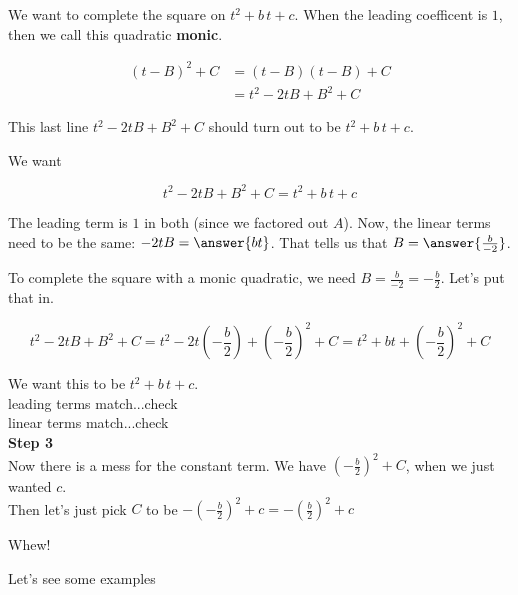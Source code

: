 \documentclass{ximera}
\begin{document}
We want to complete the square on $t^2 + b \, t + c$.  When the leading coefficent is $1$, then we call this quadratic \textbf{monic}.



\begin{align*}
(t-B)^2 + C & = (t-B)(t-B) + C \\
& = t^2 - 2 t B + B^2 + C  
\end{align*}


This last line $t^2 - 2 t B + B^2 + C$ should turn out to be $t^2 + b \, t + c$.

We want


\[   t^2 - 2 t B + B^2 + C = t^2 + b \, t + c   \]



\begin{explanation}


The leading term is $1$ in both (since we factored out $A$). Now, the linear terms need to be the same: $ - 2 t B = \answer{b t}$.  That tells us that $B = \answer{\frac{b}{-2}}$.

\end{explanation}


To complete the square with a monic quadratic, we need $B = \frac{b}{-2} = -\frac{b}{2}$.  Let's put that in.


\[ t^2 - 2 t B + B^2 + C = t^2 - 2 t \left( -\frac{b}{2} \right) + \left( -\frac{b}{2} \right)^2 + C = t^2 + b t + \left(-\frac{b}{2}\right)^2 + C \]


We want this to be $t^2 + b \, t + c$. \\

leading terms match...check \\
linear terms match...check \\


\textbf{\textcolor{blue!75!black}{Step 3}} \\


Now there is a mess for the constant term.  We have $\left( -\frac{b}{2}\right )^2 + C$, when we just wanted $c$.  \\

Then let's just pick $C$ to be $-\left( -\frac{b}{2}\right )^2 + c = -\left(\frac{b}{2}\right)^2 + c$



Whew!

Let's see some examples
\end{document}
